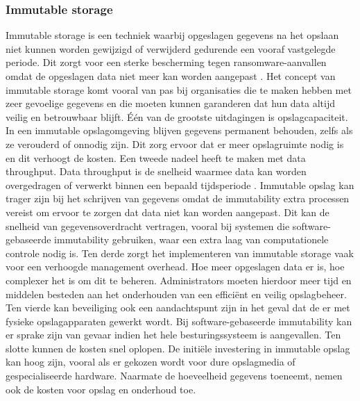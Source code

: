 \subsubsection{Immutable storage}
Immutable storage is een techniek waarbij opgeslagen gegevens na het opslaan niet kunnen worden gewijzigd of verwijderd gedurende een vooraf vastgelegde periode. Dit zorgt voor een sterke bescherming tegen ransomware-aanvallen omdat de opgeslagen data niet meer kan worden aangepast \autocite{Wahl2023}. Het concept van immutable storage komt vooral van pas bij organisaties die te maken hebben met zeer gevoelige gegevens en die moeten kunnen garanderen dat hun data altijd veilig en betrouwbaar blijft. Één van de grootste uitdagingen is opslagcapaciteit. In een immutable opslagomgeving blijven gegevens permanent behouden, zelfs als ze verouderd of onnodig zijn. Dit zorg ervoor dat er meer opslagruimte nodig is en dit verhoogt de kosten. Een tweede nadeel heeft te maken met data throughput. Data throughput is de snelheid waarmee data kan worden overgedragen of verwerkt binnen een bepaald tijdsperiode \autocite{Miao2016}. Immutable opslag kan trager zijn bij het schrijven van gegevens omdat de immutability extra processen vereist om ervoor te zorgen dat data niet kan worden aangepast. Dit kan de snelheid van gegevensoverdracht vertragen, vooral bij systemen die software-gebaseerde immutability gebruiken, waar een extra laag van computationele controle nodig is. Ten derde zorgt het implementeren  van immutable storage vaak voor een verhoogde management overhead. Hoe meer opgeslagen data er is, hoe complexer het is om dit te beheren. Administrators moeten hierdoor meer tijd en middelen besteden aan het onderhouden van een efficiënt en veilig opslagbeheer. Ten vierde kan beveiliging ook een aandachtspunt zijn in het geval dat de er met fysieke opslagapparaten gewerkt wordt. Bij software-gebaseerde immutability kan er sprake zijn van gevaar indien het hele besturingssysteem is aangevallen. Ten slotte kunnen de kosten snel oplopen. De initiële investering in immutable opslag kan hoog zijn, vooral als er gekozen wordt voor dure opslagmedia of gespecialiseerde hardware. Naarmate de hoeveelheid gegevens toeneemt, nemen ook de kosten voor opslag en onderhoud toe\autocite{Hasan2005}.

